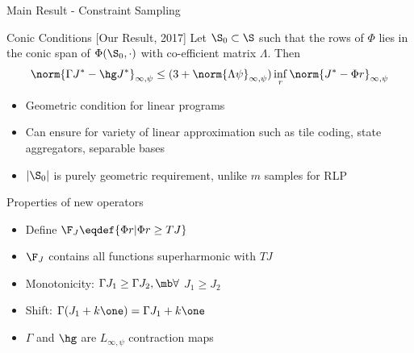 \documentclass[handout,10pt]{beamer}
\begin{document}
\begin{frame}[fragile]{Main Result - Constraint Sampling}
\begin{block}{Conic Conditions [Our Result, 2017]}
Let $\S_0\subset \S$ such that the rows of $\Phi$ lies in the conic span of $\Phi(\S_0,\cdot)$ with co-efficient matrix $\Lambda$. Then
\begin{align*}
\norm{ \Gamma J^*-\hg J^* }_{\infty,\psi}\leq (3+\norm{\Lambda \psi}_{\infty,\psi})\inf_r\norm{J^*-\Phi r}_{
\infty,\psi}
\end{align*}
\end{block}


\begin{itemize}
\item Geometric condition for linear programs
\item Can ensure for variety of linear approximation such as tile coding, state aggregators, separable bases
\item $|\S_0|$ is purely geometric requirement, unlike $m$ samples for RLP
\end{itemize}
\end{frame}


\begin{frame}[fragile]{Properties of new operators}
\begin{itemize}
\item Define $\F_J\eqdef\{\Phi r | \Phi r\geq TJ \}$
\item $\F_J$ contains all functions superharmonic with $TJ$
\item {Monotonicity:} $\Gamma J_1\geq \Gamma J_2, \mb \forall$ $J_1\geq J_2$
\item {Shift:} $\Gamma (J_1+k\one)= \Gamma J_1+ k\one$
\item $\Gamma$ and $\hg$ are $L_{\infty,\psi}$ contraction maps
\end{itemize}

\end{frame}
\end{document}
